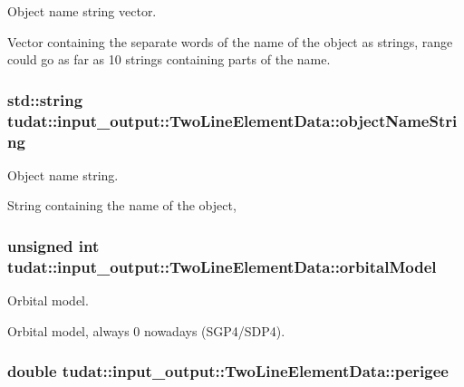 Object name string vector. 

Vector containing the separate words of the name of the object as strings, range could go as far as 10 strings containing parts of the name. 
\subsubsection[{\texorpdfstring{object\+Name\+String}{objectNameString}}]{\setlength{\rightskip}{0pt plus 5cm}std\+::string tudat\+::input\+\_\+output\+::\+Two\+Line\+Element\+Data\+::object\+Name\+String}\hypertarget{structtudat_1_1input__output_1_1TwoLineElementData_a0ed990433cffffef476dbc74ef24dd86}{}\label{structtudat_1_1input__output_1_1TwoLineElementData_a0ed990433cffffef476dbc74ef24dd86}


Object name string. 

String containing the name of the object, 
\subsubsection[{\texorpdfstring{orbital\+Model}{orbitalModel}}]{\setlength{\rightskip}{0pt plus 5cm}unsigned int tudat\+::input\+\_\+output\+::\+Two\+Line\+Element\+Data\+::orbital\+Model}\hypertarget{structtudat_1_1input__output_1_1TwoLineElementData_afc8d0b260a138b058157dcf4056409eb}{}\label{structtudat_1_1input__output_1_1TwoLineElementData_afc8d0b260a138b058157dcf4056409eb}


Orbital model. 

Orbital model, always \textquotesingle{}0\textquotesingle{} nowadays (S\+G\+P4/\+S\+D\+P4). 
\subsubsection[{\texorpdfstring{perigee}{perigee}}]{\setlength{\rightskip}{0pt plus 5cm}double tudat\+::input\+\_\+output\+::\+Two\+Line\+Element\+Data\+::perigee}\hypertarget{structtudat_1_1input__output_1_1TwoLineElementData_a9e2c17476a8256d1298e994dd20a236f}{}\label{structtudat_1_1input__output_1_1TwoLineElementData_a9e2c17476a8256d1298e994dd20a236f}


